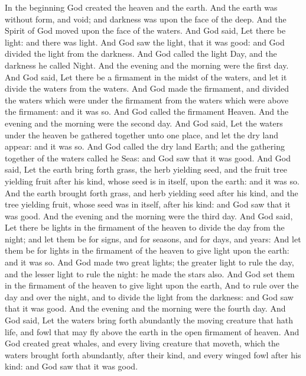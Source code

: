 
\begin{biblechapter} %
\verse In the beginning God created the heaven and the earth.
\verse And the earth was without form, and void; and darkness was upon the face of the deep. And the Spirit of God moved upon the face of the waters.
\verse And God said, Let there be light: and there was light.
\verse And God saw the light, that it was good: and God divided the light from the darkness.
\verse And God called the light Day, and the darkness he called Night. And the evening and the morning were the first day.
\verse And God said, Let there be a firmament in the midst of the waters, and let it divide the waters from the waters.
\verse And God made the firmament, and divided the waters which were under the firmament from the waters which were above the firmament: and it was so.
\verse And God called the firmament Heaven. And the evening and the morning were the second day.
\verse And God said, Let the waters under the heaven be gathered together unto one place, and let the dry land appear: and it was so.
\verse And God called the dry land Earth; and the gathering together of the waters called he Seas: and God saw that it was good.
\verse And God said, Let the earth bring forth grass, the herb yielding seed, and the fruit tree yielding fruit after his kind, whose seed is in itself, upon the earth: and it was so.
\verse And the earth brought forth grass, and herb yielding seed after his kind, and the tree yielding fruit, whose seed was in itself, after his kind: and God saw that it was good.
\verse And the evening and the morning were the third day.
\verse And God said, Let there be lights in the firmament of the heaven to divide the day from the night; and let them be for signs, and for seasons, and for days, and years:
\verse And let them be for lights in the firmament of the heaven to give light upon the earth: and it was so.
\verse And God made two great lights; the greater light to rule the day, and the lesser light to rule the night: he made the stars also.
\verse And God set them in the firmament of the heaven to give light upon the earth,
\verse And to rule over the day and over the night, and to divide the light from the darkness: and God saw that it was good.
\verse And the evening and the morning were the fourth day.
\verse And God said, Let the waters bring forth abundantly the moving creature that hath life, and fowl that may fly above the earth in the open firmament of heaven.
\verse And God created great whales, and every living creature that moveth, which the waters brought forth abundantly, after their kind, and every winged fowl after his kind: and God saw that it was good.

\end{biblechapter}
